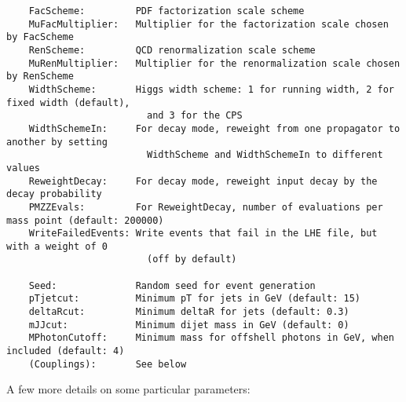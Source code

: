 \documentclass[aps,superscriptaddress,nofootinbib]{revtex4}
\begin{document}
\begin{verbatim}
    FacScheme:         PDF factorization scale scheme
    MuFacMultiplier:   Multiplier for the factorization scale chosen by FacScheme
    RenScheme:         QCD renormalization scale scheme
    MuRenMultiplier:   Multiplier for the renormalization scale chosen by RenScheme
    WidthScheme:       Higgs width scheme: 1 for running width, 2 for fixed width (default),
                         and 3 for the CPS
    WidthSchemeIn:     For decay mode, reweight from one propagator to another by setting
                         WidthScheme and WidthSchemeIn to different values
    ReweightDecay:     For decay mode, reweight input decay by the decay probability
    PMZZEvals:         For ReweightDecay, number of evaluations per mass point (default: 200000)
    WriteFailedEvents: Write events that fail in the LHE file, but with a weight of 0
                         (off by default)

    Seed:              Random seed for event generation
    pTjetcut:          Minimum pT for jets in GeV (default: 15)
    deltaRcut:         Minimum deltaR for jets (default: 0.3)
    mJJcut:            Minimum dijet mass in GeV (default: 0)
    MPhotonCutoff:     Minimum mass for offshell photons in GeV, when included (default: 4)
    (Couplings):       See below
\end{verbatim}

\noindent
A few more details on some particular parameters:
\end{document}
